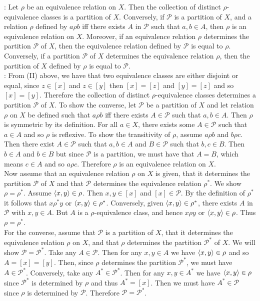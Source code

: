 \documentclass[12pt]{book}
\begin{document}
: Let $\rho$ be an equivalence relation on $X$. Then the collection of distinct $\rho$-equivalence classes is a partition of $X$. Conversely, if $\mathcal{P}$ is a partition of $X$, and a relation $\rho$ defined by $a\rho b$ iff there exists $A$ in $\mathcal{P}$ such that $a,b\in A$, then $\rho$ is an equivalence relation on $X$. Moreover, if an equivalence relation $\rho$ determines the partition $\mathcal{P}$ of $X$, then the equivalence relation defined by $\mathcal{P}$ is equal to $\rho$. Conversely, if a partition $\mathcal{P}$ of $X$ determines the equivalence relation $\rho$, then the partition of $X$ defined by $\rho$ is equal to $\mathcal{P}$.\\
: From (II) above, we have that two equivalence classes are either disjoint or equal, since $z\in [x]$ and $z\in [y]$ then $[x] = [z]$ and $[y] = [z]$ and so $[x] = [y]$. Therefore the collection of distinct $\rho$-equivalence classes determines a partition $\mathcal{P}$ of $X$. To show the converse, let $\mathcal{P}$ be a partition of $X$ and let relation $\rho$ on $X$ be defined such that $a\rho b$ iff there exists $A\in \mathcal{P}$ such that $a,b\in A$. Then $\rho$ is symmetric by its definition. For all $a\in X$, there exists some $A \in \mathcal{P}$ such that $a\in A$ and so $\rho$ is reflexive. To show the transitivity of $\rho$, assume $a\rho b$ and $b\rho c$. Then there exist $A\in \mathcal{P}$ such that $a,b\in A$ and $B\in \mathcal{P}$ such that $b,c\in B$. Then $b\in A$ and $b\in B$ but since $\mathcal{P}$ is a partition, we must have that $A=B$, which means $c\in A$ and so $a\rho c$. Therefore $\rho$ is an equivalence relation on $X$.\\Now assume that an equivalence relation $\rho$ on $X$ is given, that it determines the partition $\mathcal{P}$ of $X$ and that $\mathcal{P}$ determines the equivalence relation $\rho^*$. We show $\rho = \rho^*$. Assume $\langle x,y\rangle\in\rho$. Then $x,y\in [x]$ and $[x]\in \mathcal{P}$. By the definition of $\rho^*$ it follows that $x\rho^* y$ or $\langle x,y\rangle\in \rho^*$. Conversely, given $\langle x,y\rangle\in\rho^*$, there exists $A$ in $\mathcal{P}$ with $x,y\in A$. But $A$ is a $\rho$-equivalence class, and hence $x\rho y$ or $\langle x,y\rangle\in\rho$. Thus $\rho = \rho^*$.\\For the converse, assume that $\mathcal{P}$ is a partition of $X$, that it determines the equivalence relation $\rho$ on $X$, and that $\rho$ determines the partition $\mathcal{P}^*$ of $X$. We will show $\mathcal{P} = \mathcal{P}^*$. Take any $A\in\mathcal{P}$. Then for any $x,y\in A$ we have $\langle x,y\rangle\in\rho$ and so $A = [x] = [y]$. Then, since $\rho$ determines the partition $\mathcal{P^*}$, we must have $A\in\mathcal{P^*}$. Conversely, take any $A^*\in\mathcal{P^*}$. Then for any $x,y\in A^*$ we have $\langle x,y\rangle\in\rho$ since $\mathcal{P^*}$ is determined by $\rho$ and thus $A^* = [x]$. Then we must have $A^* \in\mathcal{P}$ since $\rho$ is determined by $\mathcal{P}$. Therefore $\mathcal{P} = \mathcal{P^*}$.\\
\end{document}

